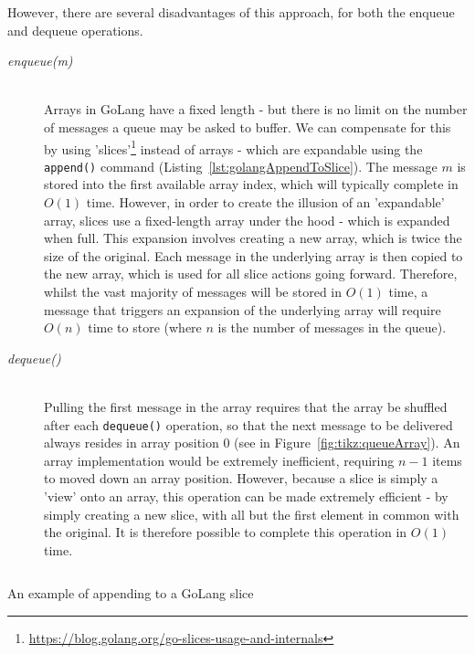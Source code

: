 However, there are several disadvantages of this approach, for both the enqueue and dequeue operations.

\begin{description}
  \item[\textit{enqueue(m)}] \hfill \\
    Arrays in GoLang have a fixed length - but there is no limit on the number
    of messages a queue may be asked to buffer. We can compensate for this by
    using
    'slices'\footnote{\url{https://blog.golang.org/go-slices-usage-and-internals}}
    instead of arrays - which are expandable using the \texttt{append()}
    command (Listing~\ref{lst:golangAppendToSlice}). The message $m$ is stored
    into the first available array index, which will typically complete in
    $O(1)$ time. However, in order to create the illusion of an 'expandable'
    array, slices use a fixed-length array under the hood - which is expanded
    when full. This expansion involves creating a new array, which is twice the
    size of the original. Each message in the underlying array is then copied to
    the new array, which is used for all slice actions going forward. Therefore,
    whilst the vast majority of messages will be stored in $O(1)$ time, a
    message that triggers an expansion of the underlying array will require
    $O(n)$ time to store (where $n$ is the number of messages in the
    queue).
  \item[\textit{dequeue()}] \hfill \\
    Pulling the first message in the array requires that the array be shuffled
    after each \texttt{dequeue()} operation, so that the next message to
    be delivered always resides in  array position 0 (see in
    Figure~\ref{fig:tikz:queueArray}). An array implementation would be
    extremely inefficient, requiring $n - 1$ items to moved down an array
    position. However, because a slice is simply a 'view' onto an array, this
    operation can be made extremely efficient - by simply creating a new slice,
    with all but the first element in common with the original.
    It is therefore possible to complete this operation in $O(1)$ time.
\end{description}

\begin{listing}[H]
  \centering
  \inputminted[firstline=7, lastline=12]{go}{code/snippets/appendToSlice.go}
  \caption{An example of appending to a GoLang slice}
  \label{lst:golangAppendToSlice}
\end{listing}


